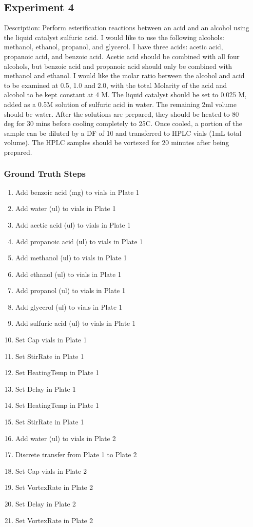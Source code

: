 \documentclass[sn-nature, twocolumn]{sn-jnl}%
\theoremstyle{thmstyleone}%
\theoremstyle{thmstyletwo}%
\theoremstyle{thmstylethree}%
\begin{document}
 

\subsection{Experiment 4}
Description: Perform esterification reactions between an acid and an alcohol using the liquid catalyst sulfuric acid.  I would like to use the following alcohols: methanol, ethanol, propanol, and glycerol.  I have three acids:  acetic acid, propanoic acid, and benzoic acid.  Acetic acid should be combined with all four alcohols, but benzoic acid and propanoic acid should only be combined with methanol and ethanol.  I would like the molar ratio between the alcohol and acid to be examined at 0.5, 1.0 and 2.0, with the total Molarity of the acid and alcohol to be kept constant at 4 M.  The liquid catalyst should be set to 0.025 M, added as a 0.5M solution of sulfuric acid in water.  The remaining 2ml volume should be water.  After the solutions are prepared, they should be heated to 80 deg for 30 mins before cooling completely to 25C.  Once cooled, a portion of the sample can be diluted by a DF of 10 and transferred to HPLC vials (1mL total volume).  The HPLC samples should be vortexed for 20 minutes after being prepared.

\subsubsection*{Ground Truth Steps}
\begin{enumerate}[itemsep=0pt]
    \item Add benzoic acid (mg) to vials in Plate 1
    \item Add water (ul) to vials in Plate 1
    \item Add acetic acid (ul) to vials in Plate 1
    \item Add propanoic acid (ul) to vials in Plate 1
    \item Add methanol (ul) to vials in Plate 1
    \item Add ethanol (ul) to vials in Plate 1
    \item Add propanol (ul) to vials in Plate 1
    \item Add glycerol (ul) to vials in Plate 1
    \item Add sulfuric acid (ul) to vials in Plate 1
    \item Set Cap vials in Plate 1
    \item Set StirRate in Plate 1
    \item Set HeatingTemp in Plate 1
    \item Set Delay in Plate 1
    \item Set HeatingTemp in Plate 1
    \item Set StirRate in Plate 1
    \item Add water (ul) to vials in Plate 2
    \item Discrete transfer from Plate 1 to Plate 2
    \item Set Cap vials in Plate 2
    \item Set VortexRate in Plate 2
    \item Set Delay in Plate 2
    \item Set VortexRate in Plate 2
\end{enumerate}
\end{document}
